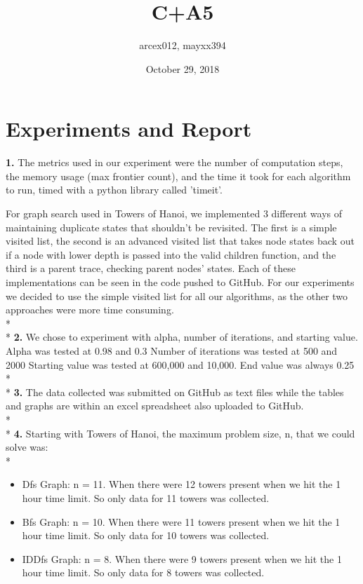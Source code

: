 \documentclass{article}
\title{C+A5}
\author{arcex012, mayxx394}
\date{October 29, 2018}
\begin{document}
\maketitle

\section{Experiments and Report}

\textbf{1.}
The metrics used in our experiment were the number of computation steps, the memory usage (max frontier count), and the time it took for each algorithm to run, timed with a python library called 'timeit'. 

For graph search used in Towers of Hanoi, we implemented 3 different ways of maintaining duplicate states that shouldn't be revisited. The first is a simple visited list, the second is an advanced visited list that takes node states back out if a node with lower depth is passed into the valid children function, and the third is a parent trace, checking parent nodes' states. Each of these implementations can be seen in the code pushed to GitHub. For our experiments we decided to use the simple visited list for all our algorithms, as the other two approaches were more time consuming.
\\*
\\*
\textbf{2.}
We chose to experiment with alpha, number of iterations, and starting value. Alpha was tested at 0.98 and 0.3 Number of iterations was tested at 500 and 2000 Starting value was tested at 600,000 and 10,000. End value was always 0.25
\\*
\\*
\textbf{3.}
The data collected was submitted on GitHub as text files while the tables and graphs are within an excel spreadsheet also uploaded to GitHub.
\\*
\\*
\textbf{4.}
Starting with Towers of Hanoi, the maximum problem size, n, that we could solve was:
\\*
\begin{itemize}
\item Dfs Graph: n = 11. When there were 12 towers present when we hit the 1 hour time limit. So only data for 11 towers was collected. 

\item Bfs Graph: n = 10. When there were 11 towers present when we hit the 1 hour time limit. So only data for 10 towers was collected. 

\item IDDfs Graph: n = 8. When there were 9 towers present when we hit the 1 hour time limit. So only data for 8 towers was collected. 

\end{itemize}
\end{document}
